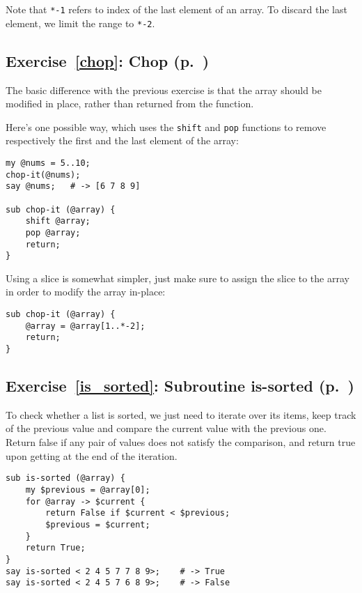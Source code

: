 Note that \verb'*-1' refers to index of the last element 
of an array. To discard the last element, we limit the 
range to \verb'*-2'.

\subsection{Exercise~\ref{chop}: Chop (p.~\pageref{chop})}
\label{sol_chop}

The basic difference with the previous exercise is that 
the array should be modified in place, rather than 
returned from the function.

Here's one possible way, which uses the {\tt shift} and 
{\tt pop} functions to remove respectively the first 
and the last element of the array:

\begin{verbatim}
my @nums = 5..10;
chop-it(@nums); 
say @nums;   # -> [6 7 8 9]

sub chop-it (@array) { 
    shift @array; 
    pop @array; 
    return;
}
\end{verbatim}

Using a slice is somewhat simpler, just make sure to 
assign the slice to the array in order to modify the 
array in-place:

\begin{verbatim}
sub chop-it (@array) { 
    @array = @array[1..*-2];
    return;
}
\end{verbatim}
%

\subsection{Exercise~\ref{is_sorted}: Subroutine is-sorted (p.~\pageref{is_sorted})}
\label{sol_is_sorted}

To check whether a list is sorted, we just need to iterate 
over its items, keep track of the previous value and compare 
the current value with the previous one. Return false if 
any pair of values does not satisfy the comparison, and 
return true upon getting at the end of the iteration.

\begin{verbatim}
sub is-sorted (@array) {
    my $previous = @array[0];
    for @array -> $current {
        return False if $current < $previous;
        $previous = $current;
    }
    return True;
}
say is-sorted < 2 4 5 7 7 8 9>;    # -> True
say is-sorted < 2 4 5 7 6 8 9>;    # -> False
\end{verbatim}

